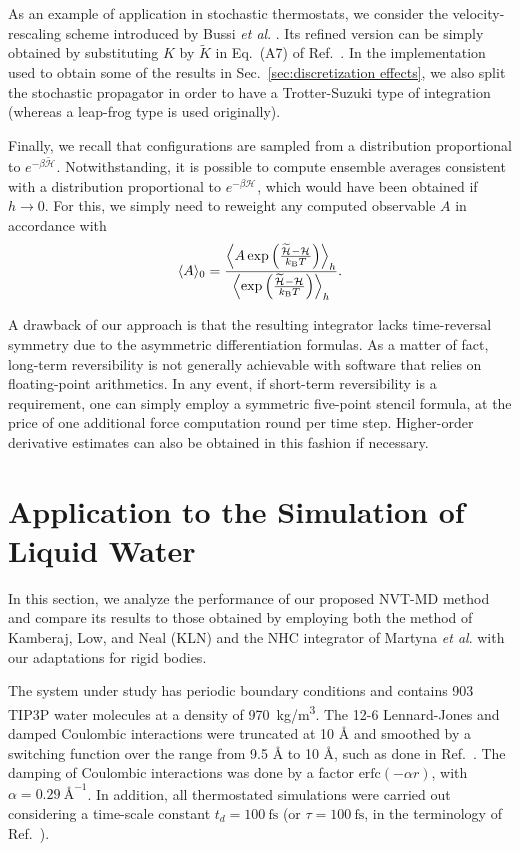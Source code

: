 \documentclass[
	aip,
	jcp,
	reprint,
]{revtex4-1}
\newcommand{\Ham}[1]{{\mathcal H}_\text{#1}}           %
\newcommand{\timestep}{h}
\newcommand{\refined}[1]{\widetilde{#1}}
\newcommand{\mini}[1]{\text{\tiny{#1}}}
\begin{document}
As an example of application in stochastic thermostats, we consider the  velocity-rescaling scheme introduced by Bussi \textit{et al}. \cite{Bussi_2007}.
Its refined version can be simply obtained by substituting $K$ by $\refined{K}$ in Eq.~(A7) of Ref.~.
In the implementation used to obtain some of the results in Sec.~\ref{sec:discretization effects}, we also split the stochastic propagator in order to have a Trotter-Suzuki type of integration (whereas a leap-frog type is used originally).

Finally, we recall that configurations are sampled from a distribution proportional to $e^{-\beta \refined{\Ham{}}}$.
Notwithstanding, it is possible to compute ensemble averages consistent with a distribution proportional to $e^{-\beta \Ham{}}$, which would have been obtained if $\timestep \to 0$.
For this, we simply need to reweight any computed observable $A$ in accordance with \cite{Torrie_1977}
\begin{equation}
\label{eq:reweighting}
\langle A \rangle_0 = \frac{\left\langle A \exp \left({\frac{\refined{\Ham{}} - \Ham{}}{k_\mini{B} T}}\right)\right\rangle_\timestep}{\left\langle \exp \left({\frac{\refined{\Ham{}} - \Ham{}}{k_\mini{B} T}}\right)\right\rangle_\timestep}.
\end{equation}

A drawback of our approach is that the resulting integrator lacks time-reversal symmetry due to the asymmetric differentiation formulas.
As a matter of fact, long-term reversibility is not generally achievable with software that relies on floating-point arithmetics.
In any event, if short-term reversibility is a requirement, one can simply employ a symmetric five-point stencil formula, at the price of one additional force computation round per time step.
Higher-order derivative estimates can also be obtained in this fashion if necessary.

\section{Application to the Simulation of Liquid Water}
\label{sec:numerical_results}

In this section, we analyze the performance of our proposed NVT-MD method and compare its results to those obtained by employing both the method of Kamberaj, Low, and Neal \cite{Kamberaj_2005} (KLN) and the NHC integrator of Martyna \textit{et al}. \cite{Martyna_1996} with our adaptations for rigid bodies.

The system under study has periodic boundary conditions and contains 903 TIP3P \cite{Jorgensen_1983} water molecules at a density of 970~kg/m\textsuperscript{3}.
The 12-6 Lennard-Jones and damped Coulombic interactions were truncated at 10 {\AA} and smoothed by a switching function over the range from 9.5 {\AA} to 10 {\AA}, such as done in Ref.~. 
The damping of Coulombic interactions was done by a factor $\text{erfc}(-\alpha r)$, with $\alpha = 0.29~\text{\AA}^{-1}$.
In addition, all thermostated simulations were carried out considering a time-scale constant $t_d = 100~\text{fs}$ (or $\tau = 100~\text{fs}$, in the terminology of Ref.~).
\end{document}
